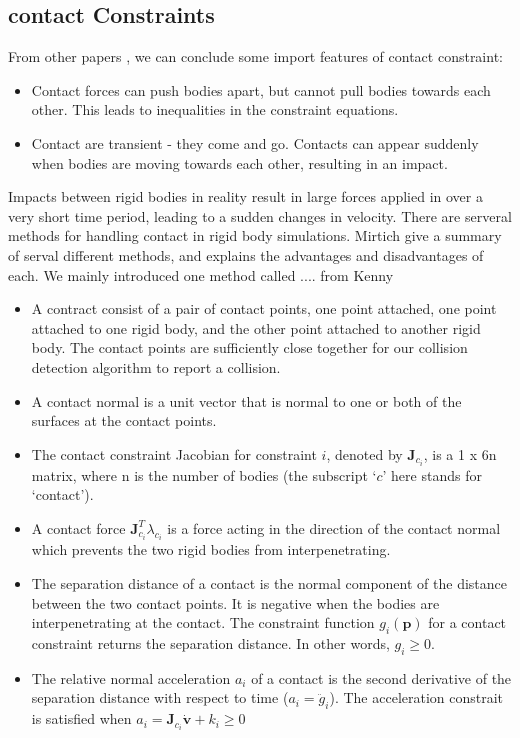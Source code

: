     \subsection{contact Constraints}
        From other papers \cite{bender2014interactive}, we can conclude some import features of contact constraint:
        \begin{itemize}
            \item Contact forces can push bodies apart, but cannot pull bodies towards each other. This leads to inequalities in the constraint equations.
            \item Contact are transient - they come and go. Contacts can appear suddenly when bodies are moving towards each other, resulting in an impact.
        \end{itemize}
        Impacts between rigid bodies in reality result in large forces applied in over a very short time period, leading to a sudden changes in velocity. There are serveral methods for handling contact in rigid body simulations. Mirtich\cite{mirtich1998rigid} give a summary of serval different methods, and explains the advantages and disadvantages of each. We mainly introduced one  method called .... from Kenny\cite{erleben2017rigid}
        \begin{itemize}
            \item A contract consist of a pair of contact points, one point attached, one point attached to one rigid body, and the other point attached to another rigid body. The contact points are sufficiently close together for our collision detection algorithm to report a collision.
            \item A contact normal is a unit vector that is normal to one or both of the surfaces at the contact points.
            \item The contact constraint Jacobian for constraint $i$, denoted by $\pmb{J}_{c_i}$, is a 1 x 6n matrix, where n is the number of bodies (the subscript `$c$' here stands for `contact').
            \item A contact force $\pmb{J}_{c_i}^{T}\lambda _{c_i}$ is a force acting in the direction of the contact normal which prevents the two rigid bodies from interpenetrating.
            \item The separation distance of a contact is the normal component of the distance between the two contact points. It is negative when the bodies are interpenetrating at the contact. The constraint function $g_{i}(\pmb{p})$ for a contact constraint returns the separation distance. In other words, $g_i \ge 0$.
            \item The relative normal acceleration $a_i$ of a contact is the second derivative of the separation distance with respect to time ($a_i = \ddot{g}_i$). The acceleration constrait is satisfied when $a_i = \pmb{J}_{c_i} \dot{\mathbf{v}}+ k_i \ge 0$
        \end{itemize}
